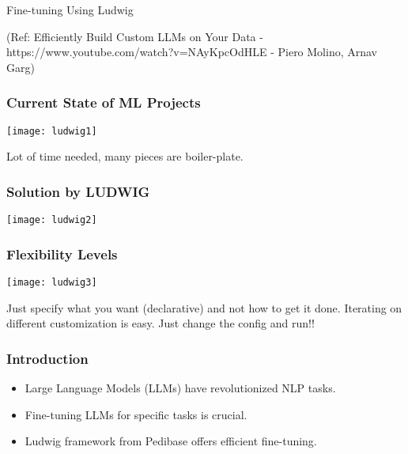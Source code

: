 \begin{frame}[fragile]\frametitle{}
\begin{center}
{\Large Fine-tuning Using Ludwig}

{\tiny (Ref: Efficiently Build Custom LLMs on Your Data - https://www.youtube.com/watch?v=NAyKpcOdHLE - Piero Molino,  Arnav Garg)}

\end{center}
\end{frame}


\begin{frame}[fragile]\frametitle{Current State of ML Projects}


		\begin{center}
		\texttt{[image: ludwig1]}
		\end{center}

Lot of time needed, many pieces are boiler-plate.
\end{frame}


\begin{frame}[fragile]\frametitle{Solution by LUDWIG}


		\begin{center}
		\texttt{[image: ludwig2]}
		\end{center}

\end{frame}

\begin{frame}[fragile]\frametitle{Flexibility Levels}


		\begin{center}
		\texttt{[image: ludwig3]}
		\end{center}

Just specify what you want (declarative) and not how to get it done.
Iterating on different customization is easy. Just change the config and run!!

\end{frame}


\begin{frame}[fragile]\frametitle{Introduction}
    \begin{itemize}
        \item Large Language Models (LLMs) have revolutionized NLP tasks.
        \item Fine-tuning LLMs for specific tasks is crucial.
        \item Ludwig framework from Pedibase offers efficient fine-tuning.
    \end{itemize}
\end{frame}


